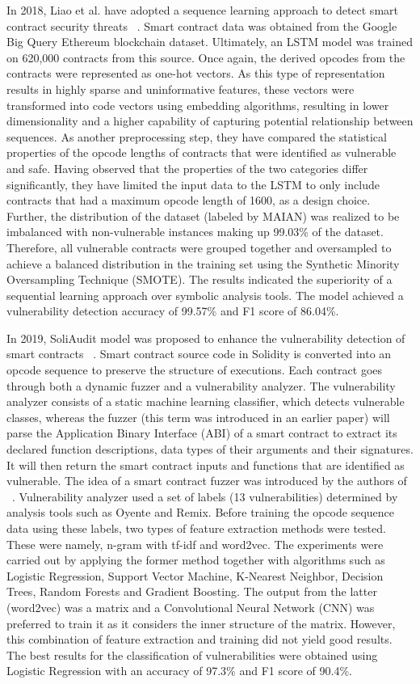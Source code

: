 In 2018, Liao et al. have adopted a sequence learning approach to detect smart contract security threats ~\cite{madmax}.
Smart contract data was obtained from the Google Big Query Ethereum blockchain dataset.
Ultimately, an LSTM model was trained on 620,000 contracts from this source. Once again, the derived opcodes from the contracts were represented as one-hot vectors.
As this type of representation results in highly sparse and uninformative features, these vectors were transformed into code vectors using embedding algorithms,
resulting in lower dimensionality and a higher capability of capturing potential relationship between sequences.
As another preprocessing step, they have compared the statistical properties of the opcode lengths of contracts that were identified as vulnerable and safe.
Having observed that the properties of the two categories differ significantly, they have limited the input data to the LSTM to only include contracts that
had a maximum opcode length of 1600, as a design choice.
Further, the distribution of the dataset (labeled by MAIAN) was realized to be imbalanced with non-vulnerable instances making up 99.03\% of the dataset.
Therefore, all vulnerable contracts were grouped together and oversampled to achieve a balanced distribution in the training set using the Synthetic Minority Oversampling Technique (SMOTE).
The results indicated the superiority of a sequential learning approach over symbolic analysis tools.
The model achieved a vulnerability detection accuracy of 99.57\% and F1 score of 86.04\%.

In 2019, SoliAudit model was proposed to enhance the vulnerability detection of smart contracts ~\cite{etehrTrust}.
Smart contract source code in Solidity is converted into an opcode sequence to preserve the structure of executions.
Each contract goes through both a dynamic fuzzer and a vulnerability analyzer.
The vulnerability analyzer consists of a static machine learning classifier, which detects vulnerable classes, whereas the fuzzer (this term was introduced in an earlier paper)
will parse the Application Binary Interface (ABI) of a smart contract to extract its declared function descriptions, data types of their arguments and their signatures.
It will then return the smart contract inputs and functions that are identified as vulnerable.
The idea of a smart contract fuzzer was introduced by the authors of ~\cite{etehrTrust}.
Vulnerability analyzer used a set of labels (13 vulnerabilities) determined by analysis tools such as Oyente and Remix.
Before training the opcode sequence data using these labels, two types of feature extraction methods were tested. These were namely, n-gram with tf-idf and word2vec.
The experiments were carried out by applying the former method together with algorithms such as Logistic Regression, Support Vector Machine, K-Nearest Neighbor, Decision Trees,
Random Forests and Gradient Boosting.
The output from the latter (word2vec) was a matrix and a Convolutional Neural Network (CNN) was preferred to train it as it considers the inner structure of the matrix.
However, this combination of feature extraction and training did not yield good results.
The best results for the classification of vulnerabilities were obtained using Logistic Regression with an accuracy of 97.3\% and F1 score of 90.4\%.

